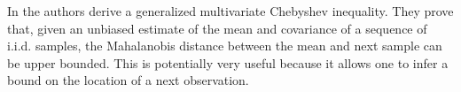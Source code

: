 \documentclass[float=false, crop=false]{standalone}
\begin{document}
	In \cite{Stellato2015} the authors derive a generalized multivariate Chebyshev inequality. They prove that, given an unbiased estimate of the mean and covariance of a sequence of i.i.d. samples, the Mahalanobis distance between the mean and next sample can be upper bounded. This is potentially very useful because it allows one to infer a bound on the location of a next observation.	

	\ifstandalone
			
		
	\fi
\end{document}
